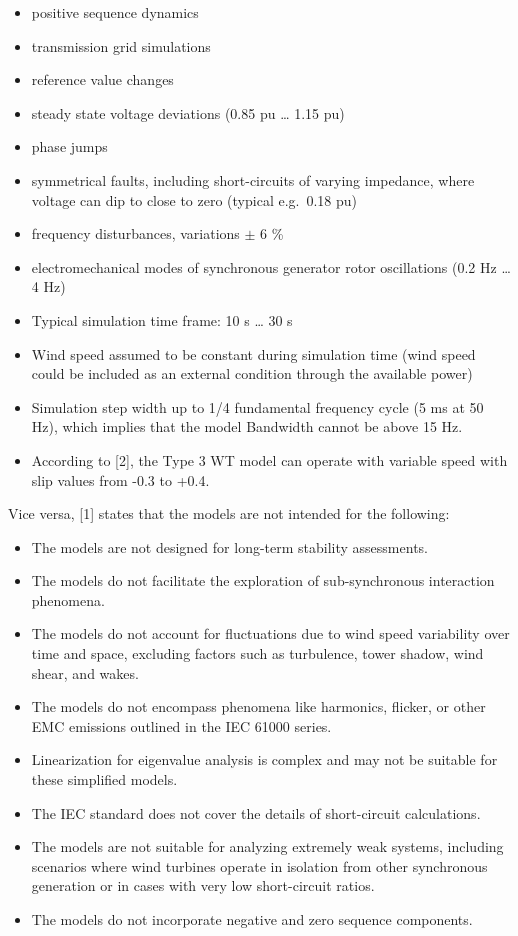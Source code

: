 \documentclass[
  a4paper,
  DIV=11,
  numbers=noendperiod]{scrartcl}
\providecommand{\tightlist}{%
  \setlength{\itemsep}{0pt}\setlength{\parskip}{0pt}}\usepackage{longtable,booktabs,array}
\begin{document}
\begin{itemize}
\tightlist
\item
  positive sequence dynamics
\item
  transmission grid simulations
\item
  reference value changes
\item
  steady state voltage deviations (0.85 pu \ldots{} 1.15 pu)
\item
  phase jumps
\item
  symmetrical faults, including short-circuits of varying impedance,
  where voltage can dip to close to zero (typical e.g.~0.18 pu)
\item
  frequency disturbances, variations \(\pm\) 6 \%
\item
  electromechanical modes of synchronous generator rotor oscillations
  (0.2 Hz \ldots{} 4 Hz)
\item
  Typical simulation time frame: 10 s \ldots{} 30 s
\item
  Wind speed assumed to be constant during simulation time (wind speed
  could be included as an external condition through the available
  power)
\item
  Simulation step width up to 1/4 fundamental frequency cycle (5 ms at
  50 Hz), which implies that the model Bandwidth cannot be above 15 Hz.
\item
  According to {[}2{]}, the Type 3 WT model can operate with variable
  speed with slip values from -0.3 to +0.4.
\end{itemize}

Vice versa, {[}1{]} states that the models are not intended for the
following:

\begin{itemize}
\tightlist
\item
  The models are not designed for long-term stability assessments.
\item
  The models do not facilitate the exploration of sub-synchronous
  interaction phenomena.
\item
  The models do not account for fluctuations due to wind speed
  variability over time and space, excluding factors such as turbulence,
  tower shadow, wind shear, and wakes.
\item
  The models do not encompass phenomena like harmonics, flicker, or
  other EMC emissions outlined in the IEC 61000 series.
\item
  Linearization for eigenvalue analysis is complex and may not be
  suitable for these simplified models.
\item
  The IEC standard does not cover the details of short-circuit
  calculations.
\item
  The models are not suitable for analyzing extremely weak systems,
  including scenarios where wind turbines operate in isolation from
  other synchronous generation or in cases with very low short-circuit
  ratios.
\item
  The models do not incorporate negative and zero sequence components.
\end{itemize}
\end{document}
